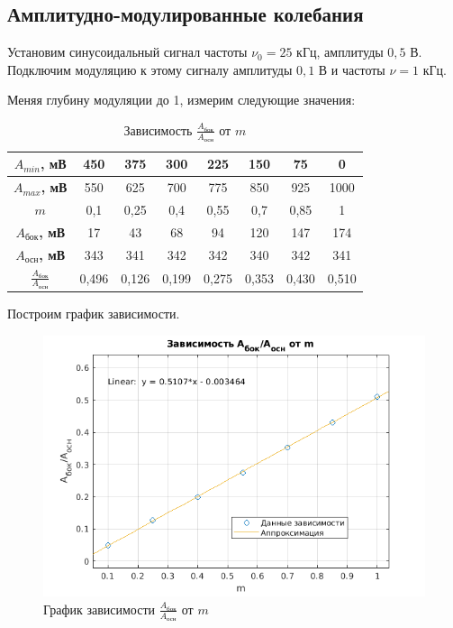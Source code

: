 \subsection{Амплитудно-модулированные колебания}

Установим синусоидальный сигнал частоты $\nu_0 = 25$ кГц, амплитуды $0,5$ В. Подключим модуляцию к этому сигналу амплитуды $0,1$ В и частоты $\nu = 1$ кГц.

Меняя глубину модуляции до 1, измерим следующие значения:

\begin{table}[h!]
    \centering
    \begin{tabular}{|c|c|c|c|c|c|c|c|}
        \hline
        \textbf{$A_{min}$, мВ}                           & 450   & 375   & 300   & 225   & 150   & 75    & 0     \\ \hline
        \textbf{$A_{max}$, мВ}                           & 550   & 625   & 700   & 775   & 850   & 925   & 1000  \\ \hline
        \textbf{$m$}                                     & 0,1   & 0,25  & 0,4   & 0,55  & 0,7   & 0,85  & 1     \\ \hline
        \textbf{$A_{\text{бок}}$, мВ}                    & 17    & 43    & 68    & 94    & 120   & 147   & 174   \\ \hline
        \textbf{$A_{\text{осн}}$, мВ}                    & 343   & 341   & 342   & 342   & 340   & 342   & 341   \\ \hline
        \textbf{$\frac{A_{\text{бок}}}{A_{\text{осн}}}$} & 0,496 & 0,126 & 0,199 & 0,275 & 0,353 & 0,430 & 0,510 \\ \hline
    \end{tabular}
    \caption{Зависимость $\frac{A_{\text{бок}}}{A_{\text{осн}}}$ от $m$}
\end{table}

Построим график зависимости.

\begin{figure}[h]
    \centering
    \includegraphics[width = 13 cm]{images/3_appr.png}
    \caption{График зависимости $\frac{A_{\text{бок}}}{A_{\text{осн}}}$ от $m$}
\end{figure}

